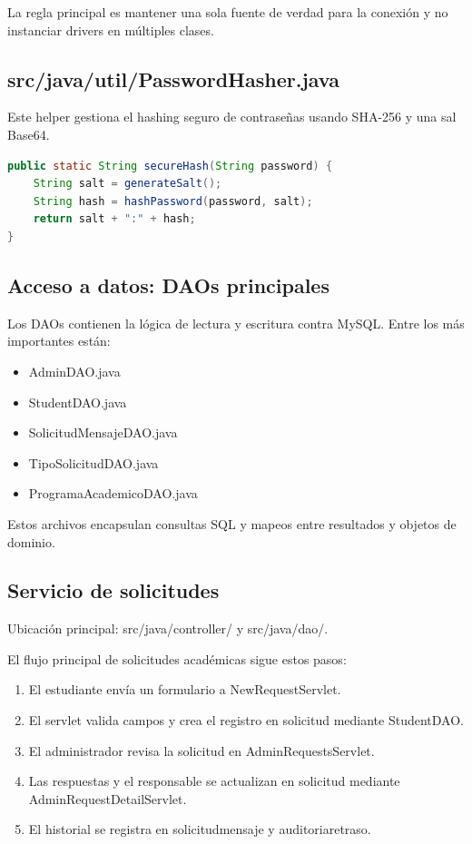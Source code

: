 \documentclass[12pt,letterpaper]{article}
\newcommand{\code}[1]{\texorpdfstring{\begingroup\normalfont\normalsize\def\_{\textunderscore\allowbreak}#1\endgroup}{#1}}
\begin{document}
La regla principal es mantener una sola fuente de verdad para la conexión y no instanciar drivers en múltiples clases.

\subsection{\texorpdfstring{\code{src/java/util/PasswordHasher.java}}{src/java/util/PasswordHasher.java}}

Este helper gestiona el hashing seguro de contraseñas usando SHA-256 y una sal Base64.

\begin{lstlisting}[language=java]
public static String secureHash(String password) {
    String salt = generateSalt();
    String hash = hashPassword(password, salt);
    return salt + ":" + hash;
}
\end{lstlisting}

\subsection{Acceso a datos: DAOs principales}

Los DAOs contienen la lógica de lectura y escritura contra MySQL. Entre los más importantes están:

\begin{itemize}
    \item \code{AdminDAO.java}
    \item \code{StudentDAO.java}
    \item \code{SolicitudMensajeDAO.java}
    \item \code{TipoSolicitudDAO.java}
    \item \code{ProgramaAcademicoDAO.java}
\end{itemize}

Estos archivos encapsulan consultas SQL y mapeos entre resultados y objetos de dominio.

\subsection{Servicio de solicitudes}

Ubicación principal: \code{src/java/controller/} y \code{src/java/dao/}.

El flujo principal de solicitudes académicas sigue estos pasos:

\begin{enumerate}
    \item El estudiante envía un formulario a \code{NewRequestServlet}.
    \item El servlet valida campos y crea el registro en \code{solicitud} mediante \code{StudentDAO}.
    \item El administrador revisa la solicitud en \code{AdminRequestsServlet}.
    \item Las respuestas y el responsable se actualizan en \code{solicitud} mediante \code{AdminRequestDetailServlet}.
    \item El historial se registra en \code{solicitud\_mensaje} y \code{auditoria\_retraso}.
\end{enumerate}
\end{document}
